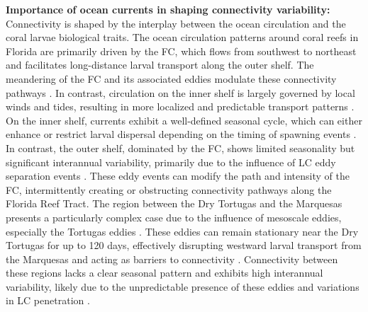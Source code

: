 \documentclass[preprint,12pt,authoryear]{elsarticle}
\begin{document}
	\textbf{Importance of ocean currents in shaping connectivity variability:}
	Connectivity is shaped by the interplay between the ocean circulation and the coral larvae biological traits. The ocean circulation patterns around coral reefs in Florida are primarily driven by the FC, which flows from southwest to northeast and facilitates long-distance larval transport along the outer shelf. The meandering of the FC and its associated eddies modulate these connectivity pathways \citep{lee1994evolution,kourafalou2012florida}. In contrast, circulation on the inner shelf is largely governed by local winds and tides, resulting in more localized and predictable transport patterns \citep{lee2002volume,liu2012seasonal}. On the inner shelf, currents exhibit a well-defined seasonal cycle, which can either enhance or restrict larval dispersal depending on the timing of spawning events \citep{liu2012seasonal}. In contrast, the outer shelf, dominated by the FC, shows limited seasonality but significant interannual variability, primarily due to the influence of LC eddy separation events \citep{kourafalou2012florida}. These eddy events can modify the path and intensity of the FC, intermittently creating or obstructing connectivity pathways along the Florida Reef Tract. The region between the Dry Tortugas and the Marquesas presents a particularly complex case due to the influence of mesoscale eddies, especially the Tortugas eddies \citep{dobbelaere2022connecting}. These eddies can remain stationary near the Dry Tortugas for up to 120 days, effectively disrupting westward larval transport from the Marquesas and acting as barriers to connectivity \citep{fratantoni1998influence,kourafalou2012florida}. Connectivity between these regions lacks a clear seasonal pattern and exhibits high interannual variability, likely due to the unpredictable presence of these eddies and variations in LC penetration \citep{lee1994evolution}.
	
\end{document}

